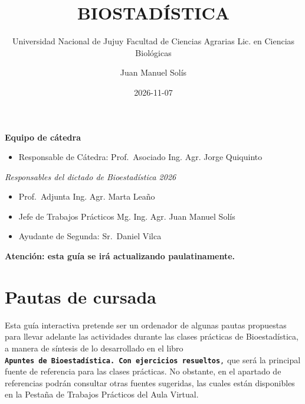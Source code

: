 \documentclass[
  spanish,
  letterpaper,
  DIV=11,
  numbers=noendperiod]{scrreprt}
\title{\textbar{} BIOSTADÍSTICA}
\subtitle{Universidad Nacional de Jujuy \textbar{} Facultad de Ciencias
Agrarias \textbar{} Lic. en Ciencias Biológicas}
\author{Juan Manuel Solís}
\date{2026-11-07}
\providecommand{\tightlist}{%
  \setlength{\itemsep}{0pt}\setlength{\parskip}{0pt}}
\renewcommand*\contentsname{Tabla de contenidos}
\newcommand\contentsname{Tabla de contenidos}
\begin{document}
\maketitle

\renewcommand*\contentsname{Tabla de contenidos}
{
\setcounter{tocdepth}{2}
\tableofcontents
}


\chapter*{}\label{section}

\markboth{}{}

\textbf{Equipo de cátedra}

\begin{itemize}
\tightlist
\item
  Responsable de Cátedra: Prof.~Asociado Ing. Agr. Jorge Quiquinto
\end{itemize}

\emph{Responsables del dictado de Bioestadística 2026}

\begin{itemize}
\item
  Prof.~Adjunta Ing. Agr. Marta Leaño
\item
  Jefe de Trabajos Prácticos Mg. Ing. Agr. Juan Manuel Solís
\item
  Ayudante de Segunda: Sr.~Daniel Vilca
\end{itemize}

\textbf{Atención: esta guía se irá actualizando paulatinamente.}


\chapter{Pautas de cursada}\label{pautas-de-cursada}

Esta guía interactiva pretende ser un ordenador de algunas pautas
propuestas para llevar adelante las actividades durante las clases
prácticas de Bioestadística, a manera de síntesis de lo desarrollado en
el libro
\textbf{\texttt{Apuntes\ de\ Bioestadística.\ Con\ ejercicios\ resueltos}}\texttt{,}
que será la principal fuente de referencia para las clases prácticas. No
obstante, en el apartado de referencias podrán consultar otras fuentes
sugeridas, las cuales están disponibles en la Pestaña de Trabajos
Prácticos del Aula Virtual.
\end{document}
